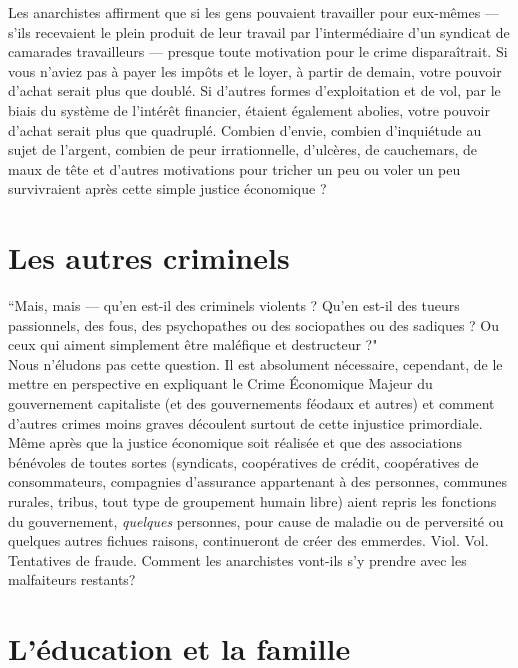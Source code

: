 Les anarchistes affirment que si les gens pouvaient travailler pour eux-mêmes --- s'ils recevaient le plein produit de leur travail par l'intermédiaire d'un syndicat de camarades travailleurs --- presque toute motivation pour le crime disparaîtrait. Si vous n'aviez pas à payer les impôts et le loyer, à partir de demain, votre pouvoir d'achat serait plus que doublé. Si d'autres formes d'exploitation et de vol, par le biais du système de l'intérêt financier, étaient également abolies, votre pouvoir d'achat serait plus que quadruplé. Combien d'envie, combien d'inquiétude au sujet de l'argent, combien de peur irrationnelle, d'ulcères, de cauchemars, de maux de tête et d'autres motivations pour tricher un peu ou voler un peu survivraient après cette simple justice économique ?

\section*{Les autres criminels}

``Mais, mais --- qu'en est-il des criminels violents ? Qu'en est-il des tueurs passionnels, des fous, des psychopathes ou des sociopathes ou des sadiques ? Ou ceux qui aiment simplement être maléfique et destructeur ?"\\
Nous n'éludons pas cette question. Il est absolument nécessaire, cependant, de le mettre en perspective en expliquant le Crime Économique Majeur du gouvernement capitaliste (et des gouvernements féodaux et autres) et comment d'autres crimes moins graves découlent surtout de cette injustice primordiale.\\
Même après que la justice économique soit réalisée et que des associations bénévoles de toutes sortes (syndicats, coopératives de crédit, coopératives de consommateurs, compagnies d'assurance appartenant à des personnes, communes rurales, tribus, tout type de groupement humain libre) aient repris les fonctions du gouvernement, \emph{quelques} personnes, pour cause de maladie ou de perversité ou quelques autres fichues raisons, continueront de créer des emmerdes. Viol. Vol. Tentatives de fraude. Comment les anarchistes vont-ils s'y prendre avec les malfaiteurs restants?

\section*{L'éducation et la famille}

